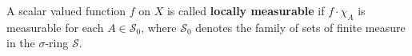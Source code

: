 A scalar valued function $f$ on $X$ is called \textbf{locally measurable} if $f \cdot \chi_A$ is measurable for each $A \in \mathcal{S}_0$, where $\mathcal{S}_0$ denotes the family of sets of finite measure in the $\sigma$-ring $\mathcal{S}$.
